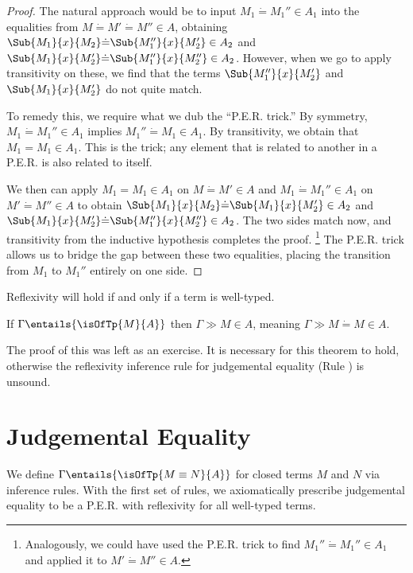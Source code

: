 \documentclass[letterpaper]{article}
\begin{document}
\begin{proof}
The natural approach would be to input $M_1 \dot{=} M_1'' \in A_1$ into the equalities from $M \dot{=} M' \dot{=} M'' \in A$, obtaining 
$\Sub{M_1}{x}{M_2} \dot{=} \Sub{M_1''}{x}{M_2'} \in A_2$ and $\Sub{M_1}{x}{M_2'} \dot{=} \Sub{M_1''}{x}{M_2''} \in A_2$. However, when we go to apply
transitivity on these, we find that the terms $\Sub{M_1''}{x}{M_2'}$ and $\Sub{M_1}{x}{M_2'}$ do not quite match. 

To remedy this, we require what we dub the ``P.E.R. trick.'' By symmetry, $M_1 \dot{=} M_1'' \in A_1$ implies $M_1'' \dot{=} M_1 \in A_1$.
By transitivity, we obtain that $M_1 = M_1 \in A_1$. This is the trick; any element that is related to another in a P.E.R. is also related to itself.

We then can apply $M_1 = M_1 \in A_1$ on $M \dot{=} M' \in A$ and $M_1 \dot{=} M_1'' \in A_1$ on $M' \dot{=} M'' \in A$ to obtain
$\Sub{M_1}{x}{M_2} \dot{=} \Sub{M_1}{x}{M_2'} \in A_2$ and $\Sub{M_1}{x}{M_2'} \dot{=} \Sub{M_1''}{x}{M_2''} \in A_2$. The two sides match now, 
and transitivity from the inductive hypothesis completes the proof.
\footnote{Analogously, we could have used the P.E.R. trick to find $M_1'' \dot{=} M_1'' \in A_1$ and applied it to $M' \dot{=} M'' \in A$.}
The P.E.R. trick allows us to bridge the gap between these two equalities, placing the transition from $M_1$ to $M_1''$ entirely on one side.  

\end{proof}

Reflexivity will hold if and only if a term is well-typed.

\begin{theorem}[Reflexivity]
    If $\Gamma \entails{\isOfTp{M}{A}}$ then $\Gamma \gg M \in A$, meaning $\Gamma \gg M \dot{=} M \in A$.
\end{theorem}
The proof of this was left as an exercise. It is necessary for this theorem to hold, otherwise the reflexivity inference rule for judgemental equality (Rule ) is unsound.

\section{Judgemental Equality}\label{sec:jeq}

We define $\Gamma \entails{\isOfTp{M \equiv N}{A}}$ for closed terms $M$ and $N$ via inference rules. 
With the first set of rules, we axiomatically prescribe judgemental equality to be a P.E.R. with reflexivity
for all well-typed terms. 
\end{document}
